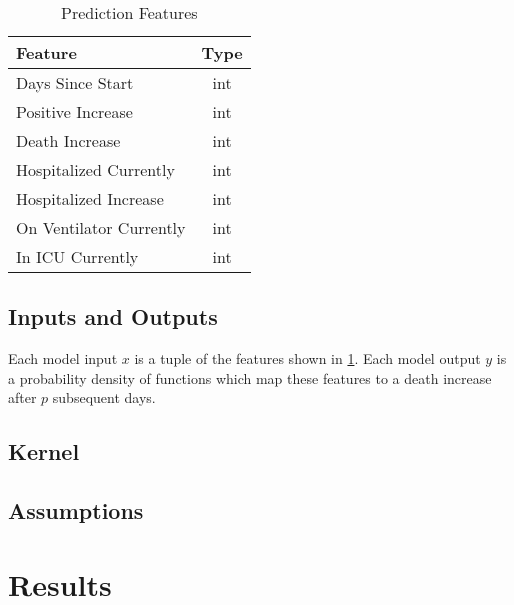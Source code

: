 \documentclass[11pt,letterpaper]{article}
\begin{document}
		\begin{table}[h]
		
		\begin{center}
		\begin{tabular}{lc}
			\hline
			Feature & Type \\
			\hline
			Days Since Start & int \\
			Positive Increase  & int \\
			Death Increase & int \\
			Hospitalized Currently & int \\
			Hospitalized Increase & int \\
			On Ventilator Currently & int \\
			In ICU Currently & int \\
			\hline
		\end{tabular}
		\end{center}
		\caption{Prediction Features}
		\label{table:features}
		\end{table}
		

		\subsection{Inputs and Outputs}
		\par Each model input $x$ is a tuple of the features shown in \cref{table:features}. Each model output $y$ is a probability density of functions which map these features to a death increase after $p$ subsequent days.
		\subsection{Kernel}
		\subsection{Assumptions}
	\section{Results}
	\printbibliography
\end{document}
